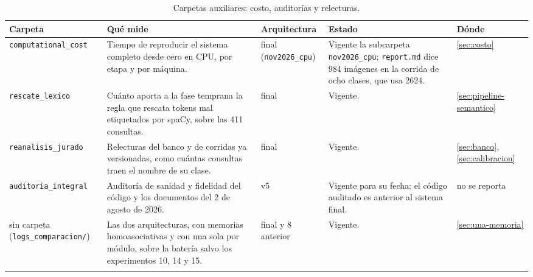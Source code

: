 \begin{table}[H]
\centering
\caption[Carpetas auxiliares]{Carpetas auxiliares: costo, auditorías y relecturas.}
\label{tab:fase-auxiliares}
\footnotesize
\setlength{\tabcolsep}{3pt}
\begin{tabular}{p{3.1cm}p{4.7cm}p{2.0cm}p{3.1cm}p{1.6cm}}
\toprule
Carpeta & Qué mide & Arquitectura & Estado & Dónde \tabularnewline
\midrule
\raggedright \texttt{computational\_\allowbreak cost} &
\raggedright Tiempo de reproducir el sistema completo desde cero en CPU, por etapa y por máquina. &
\raggedright final (\texttt{nov2026\_\allowbreak cpu}) &
\raggedright Vigente la subcarpeta \texttt{nov2026\_\allowbreak cpu}; \texttt{report.md} dice 984 imágenes en la corrida de ocho clases, que usa 2624. &
\raggedright \ref{sec:costo} \tabularnewline\addlinespace[4pt]
\raggedright \texttt{rescate\_\allowbreak lexico} &
\raggedright Cuánto aporta a la fase temprana la regla que rescata tokens mal etiquetados por spaCy, sobre las 411 consultas. &
\raggedright final &
\raggedright Vigente. &
\raggedright \ref{sec:pipeline-semantico} \tabularnewline\addlinespace[4pt]
\raggedright \texttt{reanalisis\_\allowbreak jurado} &
\raggedright Relecturas del banco y de corridas ya versionadas, como cuántas consultas traen el nombre de su clase. &
\raggedright final &
\raggedright Vigente. &
\raggedright \ref{sec:banco}, \ref{sec:calibracion} \tabularnewline\addlinespace[4pt]
\raggedright \texttt{auditoria\_\allowbreak integral} &
\raggedright Auditoría de sanidad y fidelidad del código y los documentos del 2 de agosto de 2026. &
\raggedright v5 &
\raggedright Vigente para su fecha; el código auditado es anterior al sistema final. &
\raggedright no se reporta \tabularnewline\addlinespace[4pt]
\raggedright sin carpeta (\texttt{logs\_\allowbreak comparacion/}) &
\raggedright Las dos arquitecturas, con memorias homoasociativas y con una sola por módulo, sobre la batería salvo los experimentos 10, 14 y 15. &
\raggedright final y 8 anterior &
\raggedright Vigente. &
\raggedright \ref{sec:una-memoria} \tabularnewline\addlinespace[4pt]
\bottomrule
\end{tabular}
\end{table}
